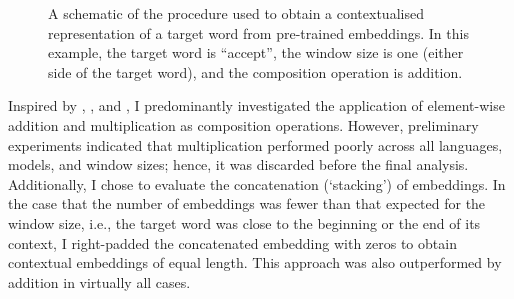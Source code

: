\begin{figure}
  \centering
  \newcommand{\period}{\text{.}}
  \newcommand*{\orawidest}{accept}
  \newcommand*{\oratallest}{\#\#}
  \newlength{\orawidth}
  \settowidth{\orawidth}{\orawidest}
  \newcommand*{\ora}[1]{\overrightarrow{#1\vphantom{\oratallest}}}
  \caption{A schematic of the procedure used
    to obtain a contextualised representation of a target word from pre-trained embeddings.
    In this example, the target word is ``accept'', the window size is one (either side of
    the target word), and the composition operation is addition.
  }
  \label{chart:schematic-procedure}
\end{figure}

Inspired by \textcite{Landauer1997}, \textcite{Kintsch2001}, and
\textcite{Mitchell2008}, I predominantly investigated the application of element-wise
addition and multiplication as composition operations.
However, preliminary experiments indicated that multiplication performed poorly across
all languages, models, and window sizes; hence, it was discarded before the final
analysis.
Additionally, I chose to evaluate the concatenation (`stacking') of embeddings.
In the case that the number of embeddings was fewer than that expected for the window
size, i.e., the target word was close to the beginning or the end of its context, I
right-padded the concatenated embedding with zeros to obtain contextual embeddings of
equal length.
This approach was also outperformed by addition in virtually all cases.

